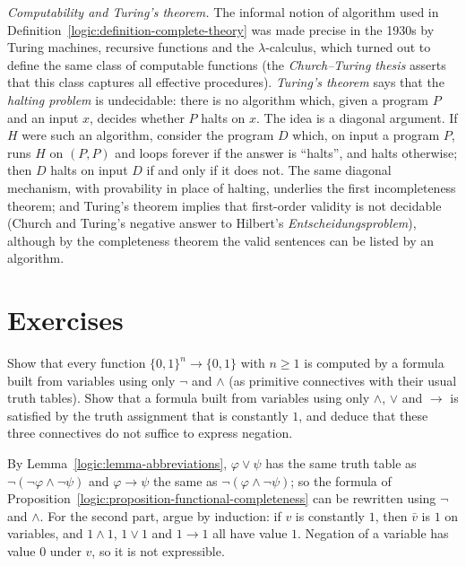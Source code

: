 \begin{remark}\label{logic:remark-turing}
\emph{Computability and Turing's theorem.} The informal notion of algorithm used in Definition~\ref{logic:definition-complete-theory} was made precise in the 1930s by Turing machines, recursive
functions and the $\lambda$-calculus, which turned out to define the same class of computable functions (the \emph{Church--Turing thesis} asserts that this class captures all effective procedures).
\emph{Turing's theorem} \cite{turing-1937} says that the \emph{halting problem} is undecidable: there is no algorithm which, given a program $P$ and an input $x$, decides whether $P$ halts on $x$. The idea
is a diagonal argument. If $H$ were such an algorithm, consider the program $D$ which, on input a program $P$, runs $H$ on $(P, P)$ and loops forever if the answer is ``halts'', and halts otherwise; then
$D$ halts on input $D$ if and only if it does not. The same diagonal mechanism, with provability in place of halting, underlies the first incompleteness theorem; and Turing's theorem implies that
first-order validity is not decidable (Church and Turing's negative answer to Hilbert's \emph{Entscheidungsproblem}), although by the completeness theorem the valid sentences can be listed by an
algorithm.
\end{remark}

\section{Exercises}\label{logic:section-exercises}

\begin{exercise}\label{logic:exercise-connectives}
Show that every function $\{0,1\}^n \to \{0,1\}$ with $n \geq 1$ is computed by
a formula built from variables using only $\neg$ and $\wedge$ (as primitive
connectives with their usual truth tables). Show that a formula built from
variables using only $\wedge$, $\vee$ and $\to$ is satisfied by the truth
assignment that is constantly $1$, and deduce that these three connectives do
not suffice to express negation.
\end{exercise}

\begin{solution}
By Lemma~\ref{logic:lemma-abbreviations}, $\varphi \vee \psi$ has the same
truth table as $\neg(\neg\varphi \wedge \neg\psi)$ and $\varphi \to \psi$ the same
as $\neg(\varphi \wedge \neg\psi)$; so the formula of
Proposition~\ref{logic:proposition-functional-completeness} can be rewritten
using $\neg$ and $\wedge$. For the second part, argue by induction: if $v$ is
constantly $1$, then $\bar v$ is $1$ on variables, and $1 \wedge 1$,
$1 \vee 1$ and $1 \to 1$ all have value $1$. Negation of a variable has value
$0$ under $v$, so it is not expressible.
\end{solution}

